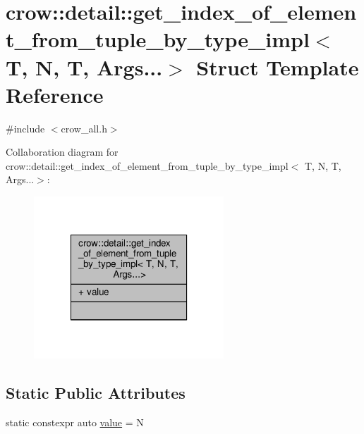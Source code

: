 \hypertarget{structcrow_1_1detail_1_1get__index__of__element__from__tuple__by__type__impl_3_01_t_00_01_n_00_01_t_00_01_args_8_8_8_4}{\section{crow\-:\-:detail\-:\-:get\-\_\-index\-\_\-of\-\_\-element\-\_\-from\-\_\-tuple\-\_\-by\-\_\-type\-\_\-impl$<$ T, N, T, Args...$>$ Struct Template Reference}
\label{structcrow_1_1detail_1_1get__index__of__element__from__tuple__by__type__impl_3_01_t_00_01_n_00_01_t_00_01_args_8_8_8_4}
}


{\ttfamily \#include $<$crow\-\_\-all.\-h$>$}



Collaboration diagram for crow\-:\-:detail\-:\-:get\-\_\-index\-\_\-of\-\_\-element\-\_\-from\-\_\-tuple\-\_\-by\-\_\-type\-\_\-impl$<$ T, N, T, Args...$>$\-:
\nopagebreak
\begin{figure}[H]
\begin{center}
\leavevmode
\includegraphics[width=202pt]{structcrow_1_1detail_1_1get__index__of__element__from__tuple__by__type__impl_3_01_t_00_01_n_00_0fad3f469c6c3271e78ee382b1a1e9d00}
\end{center}
\end{figure}
\subsection*{Static Public Attributes}
\begin{DoxyCompactItemize}
\item 
static constexpr auto \hyperlink{structcrow_1_1detail_1_1get__index__of__element__from__tuple__by__type__impl_3_01_t_00_01_n_00_01_t_00_01_args_8_8_8_4_a5c554a57f523634de6a5d749152753e8}{value} = N
\end{DoxyCompactItemize}


